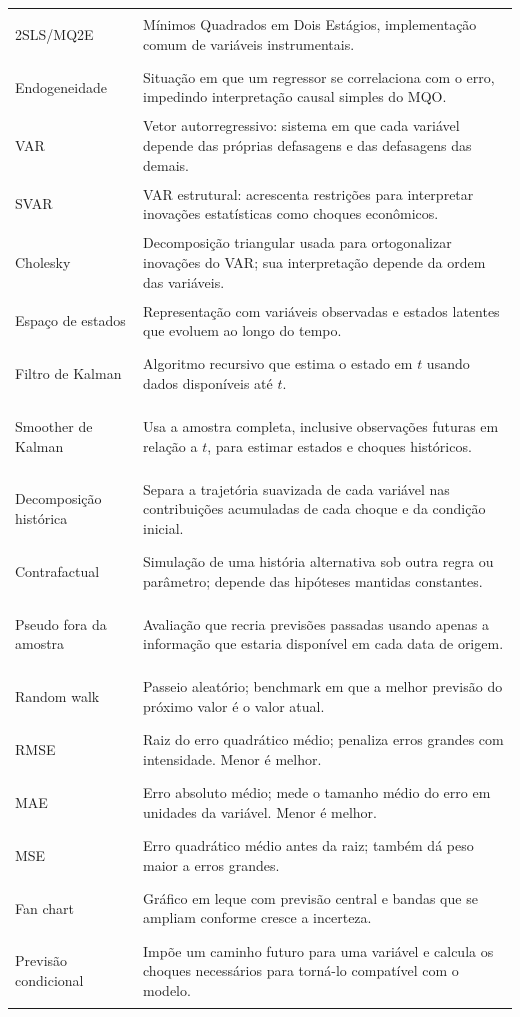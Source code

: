 \documentclass[11pt,a4paper]{article}
\begin{document}
\begin{longtable}{>{\bfseries\raggedright\arraybackslash}p{}>{\raggedright\arraybackslash}p{}}
2SLS/MQ2E & Mínimos Quadrados em Dois Estágios, implementação comum de variáveis instrumentais. \\
Endogeneidade & Situação em que um regressor se correlaciona com o erro, impedindo interpretação
causal simples do MQO. \\
VAR & Vetor autorregressivo: sistema em que cada variável depende das próprias defasagens e das
defasagens das demais. \\
SVAR & VAR estrutural: acrescenta restrições para interpretar inovações estatísticas como choques
econômicos. \\
Cholesky & Decomposição triangular usada para ortogonalizar inovações do VAR; sua interpretação
depende da ordem das variáveis. \\
Espaço de estados & Representação com variáveis observadas e estados latentes que evoluem ao
longo do tempo. \\
Filtro de Kalman & Algoritmo recursivo que estima o estado em \(t\) usando dados disponíveis até
\(t\). \\
Smoother de Kalman & Usa a amostra completa, inclusive observações futuras em relação a \(t\),
para estimar estados e choques históricos. \\
Decomposição histórica & Separa a trajetória suavizada de cada variável nas contribuições
acumuladas de cada choque e da condição inicial. \\
Contrafactual & Simulação de uma história alternativa sob outra regra ou parâmetro; depende das
hipóteses mantidas constantes. \\
Pseudo fora da amostra & Avaliação que recria previsões passadas usando apenas a informação que
estaria disponível em cada data de origem. \\
Random walk & Passeio aleatório; benchmark em que a melhor previsão do próximo valor é o valor
atual. \\
RMSE & Raiz do erro quadrático médio; penaliza erros grandes com intensidade. Menor é melhor. \\
MAE & Erro absoluto médio; mede o tamanho médio do erro em unidades da variável. Menor é melhor. \\
MSE & Erro quadrático médio antes da raiz; também dá peso maior a erros grandes. \\
Fan chart & Gráfico em leque com previsão central e bandas que se ampliam conforme cresce a
incerteza. \\
Previsão condicional & Impõe um caminho futuro para uma variável e calcula os choques necessários
para torná-lo compatível com o modelo. \\

\end{longtable}
\end{document}
